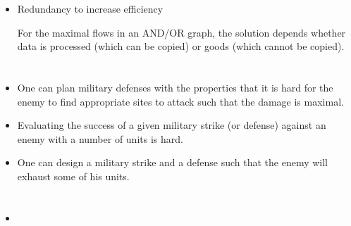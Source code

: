 \documentclass[portrait]{seminar}
\begin{document}
\begin{itemize}
\begin{itemize}
Franklin-Yung (1995) introduced the problem of Byzantine
faults in a broadcast network. Franklin-Wright (1998) shows
that ``broadcasting''  adversaries in certain situation.
However, their solution is efficient (exponential) when
$k<n\le  \frac{3}{2}\times k$. We have given a 
efficient solution to this problem. Our results also
shows that in other situations, ``broadcasting'' 
 adversaries.

\item Redundancy to increase efficiency

For the maximal flows in an AND/OR graph, the solution depends 
whether data is processed (which can be copied) or goods (which 
cannot be copied).

\end{itemize}
\end{itemize}

\newpage
\section*{}

\begin{itemize}
\item One can plan military defenses
with the properties that it is hard for the enemy to find  appropriate
sites to attack such that the damage is maximal.

\item  Evaluating the success 
of a given military strike (or defense)
against an enemy with a number of units is hard.

\item One can design a military strike and a defense
such that the enemy will exhaust some of his units.

\end{itemize}

\newpage
\section*{}

\begin{itemize}
\item{}

\end{itemize}
\end{document}
